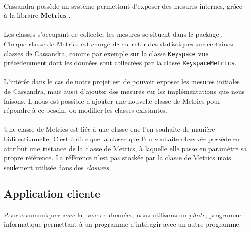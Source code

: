 \documentclass[12pt]{article}
\newcommand{\class}[1]{\texttt{#1}}
\begin{document}
\paragraph{} Cassandra possède un système permettant d'exposer des mesures internes, grâce à la libraire \textbf{Metrics} \cite{Metrics2010}.

\paragraph{} Les classes s'occupant de collecter les mesures se situent dans le package . Chaque classe de Metrics est chargé de collecter des statistiques sur certaines classes de Cassandra, comme par exemple sur la classe \class{Keyspace} vue précédemment dont les données sont collectées par la classe \class{KeyspaceMetrics}.

\paragraph{} L'intérêt dans le cas de notre projet est de pouvoir exposer les mesures initiales de Cassandra, mais aussi d'ajouter des mesures sur les implémentations que nous faisons. Il nous est possible d'ajouter une nouvelle classe de Metrics pour répondre à ce besoin, ou modifier les classes existantes.

\paragraph{} Une classe de Metrics est liée à une classe que l'on souhaite de manière bidirectionnelle. C'est à dire que la classe que l'on souhaite observée possède en attribut une instance de la classe de Metrics, à laquelle elle passe en paramètre sa propre référence. La référence n'est pas stockée par la classe de Metrics mais seulement utilisée dans des \textit{closures}.


\subsection{Application cliente}

\paragraph{} Pour communiquer avec la base de données, nous utilisons un \textit{pilote}, programme informatique permettant à un programme d'intéragir avec un autre programme.
\end{document}
